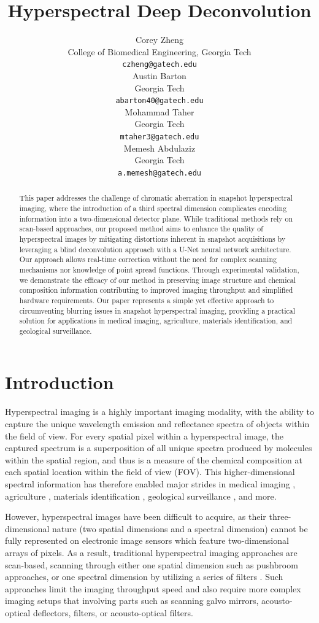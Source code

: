 \documentclass{article}
\title{Hyperspectral Deep Deconvolution}
\author{%
   Corey Zheng \\
   College of Biomedical Engineering, Georgia Tech  \\
   \texttt{czheng@gatech.edu} \\
   \AND
   Austin Barton \\
   Georgia Tech \\
   \texttt{abarton40@gatech.edu} \\
   \And
   Mohammad Taher \\
   Georgia Tech \\
   \texttt{mtaher3@gatech.edu} \\
   \And
   Memesh Abdulaziz \\
   Georgia Tech \\
   \texttt{a.memesh@gatech.edu} \\
}
\begin{document}
\maketitle


\begin{abstract}
  This paper addresses the challenge of chromatic aberration in snapshot hyperspectral imaging, where the introduction of a third spectral dimension complicates encoding information into a two-dimensional detector plane. While traditional methods rely on scan-based approaches, our proposed method aims to enhance the quality of hyperspectral images by mitigating distortions inherent in snapshot acquisitions by leveraging a blind deconvolution approach with a U-Net neural network architecture. Our approach allows real-time correction without the need for complex scanning mechanisms nor knowledge of point spread functions. Through experimental validation, we demonstrate the efficacy of our method in preserving image structure and chemical composition information contributing to improved imaging throughput and simplified hardware requirements. Our paper represents a simple yet effective approach to circumventing blurring issues in snapshot hyperspectral imaging, providing a practical solution for applications in medical imaging, agriculture, materials identification, and geological surveillance.
\end{abstract}


\section{Introduction}
Hyperspectral imaging is a highly important imaging modality, with the ability to capture the unique wavelength emission and reflectance spectra of objects within the field of view. For every spatial pixel within a hyperspectral image, the captured spectrum is a superposition of all unique spectra produced by molecules within the spatial region, and thus is a measure of the chemical composition at each spatial location within the field of view (FOV). This higher-dimensional spectral information has therefore enabled major strides in medical imaging \cite{lu2014medical}, agriculture \cite{lu2020recent}, materials identification \cite{dong2019review}, geological surveillance \cite{peyghambari2021hyperspectral}, and more.  

However, hyperspectral images have been difficult to acquire, as their three-dimensional nature (two spatial dimensions and a spectral dimension) cannot be fully represented on electronic image sensors which feature two-dimensional arrays of pixels. As a result, traditional hyperspectral imaging approaches are scan-based, scanning through either one spatial dimension such as pushbroom approaches, or one spectral dimension by utilizing a series of filters \cite{gao2015optical}. Such approaches limit the imaging throughput speed and also require more complex imaging setups that involving parts such as scanning galvo mirrors, acousto-optical deflectors, filters, or acousto-optical filters.
\end{document}
